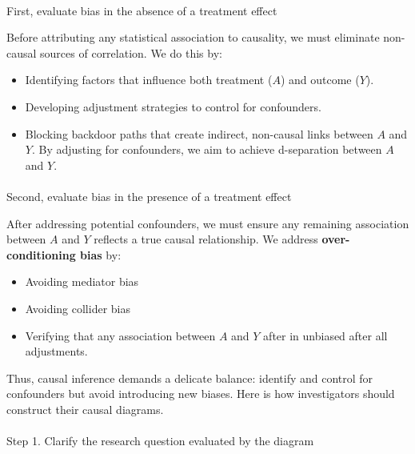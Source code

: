 \documentclass[
  single column]{article}
\makeatletter
\let\oldparagraph\paragraph
\renewcommand{\paragraph}{
    \@ifstar
      \xxxParagraphStar
      \xxxParagraphNoStar
  }
\newcommand{\xxxParagraphStar}[1]{\oldparagraph*{#1}\mbox{}}
\newcommand{\xxxParagraphNoStar}[1]{\oldparagraph{#1}\mbox{}}
\providecommand{\tightlist}{%
  \setlength{\itemsep}{0pt}\setlength{\parskip}{0pt}}\usepackage{longtable,booktabs,array}
\makeatother
\begin{document}
\paragraph{First, evaluate bias in the absence of a treatment
effect}\label{first-evaluate-bias-in-the-absence-of-a-treatment-effect}

Before attributing any statistical association to causality, we must
eliminate non-causal sources of correlation. We do this by:

\begin{itemize}
\tightlist
\item
  Identifying factors that influence both treatment (\(A\)) and outcome
  (\(Y\)).
\item
  Developing adjustment strategies to control for confounders.
\item
  Blocking backdoor paths that create indirect, non-causal links between
  \(A\) and \(Y\). By adjusting for confounders, we aim to achieve
  d-separation between \(A\) and \(Y\).
\end{itemize}

\paragraph{Second, evaluate bias in the presence of a treatment
effect}\label{second-evaluate-bias-in-the-presence-of-a-treatment-effect}

After addressing potential confounders, we must ensure any remaining
association between \(A\) and \(Y\) reflects a true causal relationship.
We address \textbf{over-conditioning bias} by:

\begin{itemize}
\tightlist
\item
  Avoiding mediator bias
\item
  Avoiding collider bias
\item
  Verifying that any association between \(A\) and \(Y\) after in
  unbiased after all adjustments.
\end{itemize}

Thus, causal inference demands a delicate balance: identify and control
for confounders but avoid introducing new biases. Here is how
investigators should construct their causal diagrams.

\paragraph{Step 1. Clarify the research question evaluated by the
diagram}\label{step-1.-clarify-the-research-question-evaluated-by-the-diagram}
\end{document}
